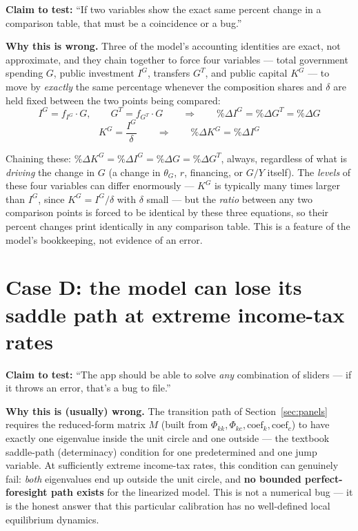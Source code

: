\documentclass[11pt]{article}
\newcommand{\eq}[1]{\begin{equation}#1\end{equation}}
\begin{document}
\textbf{Claim to test:} ``If two variables show the exact same percent
change in a comparison table, that must be a coincidence or a bug.''

\textbf{Why this is wrong.} Three of the model's accounting identities are
exact, not approximate, and they chain together to force four variables ---
total government spending $G$, public investment $I^G$, transfers $G^T$,
and public capital $K^G$ --- to move by \emph{exactly} the same percentage
whenever the composition shares and $\delta$ are held fixed between the two
points being compared:
\eq{ I^G = f_{I^G}\cdot G, \qquad G^T = f_{G^T}\cdot G \qquad \Longrightarrow \qquad \%\Delta I^G = \%\Delta G^T = \%\Delta G }
\eq{ K^G = \frac{I^G}{\delta} \qquad \Longrightarrow \qquad \%\Delta K^G = \%\Delta I^G }

Chaining these: $\%\Delta K^G=\%\Delta I^G=\%\Delta G=\%\Delta G^T$, always,
regardless of what is \emph{driving} the change in $G$ (a change in $\theta_G$,
$r$, financing, or $G/Y$ itself). The \emph{levels} of these four variables
can differ enormously --- $K^G$ is typically many times larger than $I^G$,
since $K^G=I^G/\delta$ with $\delta$ small --- but the \emph{ratio} between
any two comparison points is forced to be identical by these three
equations, so their percent changes print identically in any comparison
table. This is a feature of the model's bookkeeping, not evidence of an
error.

\section{Case D: the model can lose its saddle path at extreme income-tax rates}
\label{sec:caseD}

\textbf{Claim to test:} ``The app should be able to solve \emph{any}
combination of sliders --- if it throws an error, that's a bug to file.''

\textbf{Why this is (usually) wrong.} The transition path of
Section~\ref{sec:panels} requires the reduced-form matrix $M$ (built from
$\Phi_{kk},\Phi_{kc},\text{coef}_k,\text{coef}_c$) to have exactly one
eigenvalue inside the unit circle and one outside --- the textbook
saddle-path (determinacy) condition for one predetermined and one
jump variable. At sufficiently extreme income-tax rates, this condition
can genuinely fail: \emph{both} eigenvalues end up outside the unit
circle, and \textbf{no bounded perfect-foresight path exists} for the
linearized model. This is not a numerical bug --- it is the honest answer
that this particular calibration has no well-defined local equilibrium
dynamics.
\end{document}
